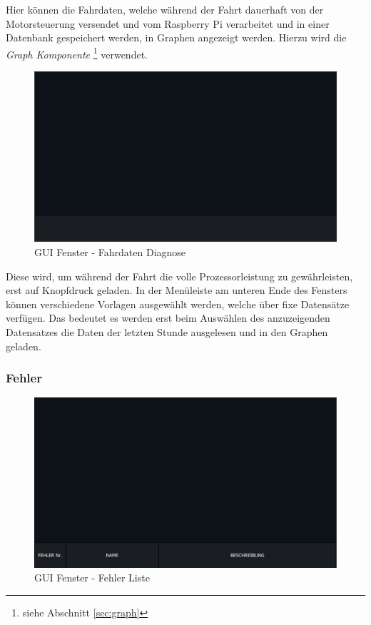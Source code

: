 Hier können die Fahrdaten, welche während der Fahrt dauerhaft von der Motorsteuerung versendet und vom Raspberry Pi verarbeitet und in einer Datenbank gespeichert werden, in Graphen angezeigt werden. Hierzu wird die \textit{Graph Komponente} \footnote{siehe Abschnitt \ref{sec:graph}} verwendet.
\begin{figure}[H]
	\begin{center}
		\includegraphics[scale=0.25]{figures/hcis/window_diagnosis.png}
			\caption{GUI Fenster - Fahrdaten Diagnose}
			\label{fig:pageDiagnose}
	\end{center}
\end{figure}

 Diese wird, um während der Fahrt die volle Prozessorleistung zu gewährleisten, erst auf Knopfdruck geladen. In der Menüleiste am unteren Ende des Fensters können verschiedene Vorlagen ausgewählt werden, welche über fixe Datensätze verfügen. Das bedeutet es werden erst beim Auswählen des anzuzeigenden Datensatzes die Daten der letzten Stunde ausgelesen und in den Graphen geladen.


\newpage

\subsubsection{Fehler}

\begin{figure}[H]
	\begin{center}
		\includegraphics[scale=0.25]{figures/hcis/window_error.png}
			\caption{GUI Fenster - Fehler Liste}
			\label{fig:pageError}
	\end{center}
\end{figure}




